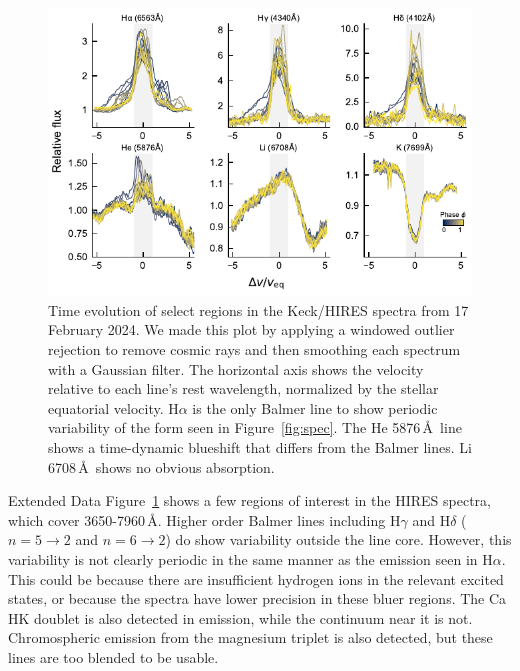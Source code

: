 \documentclass{nature3}
\begin{document}
\begin{methods}
\begin{figure}[!t]
  \centering
  \includegraphics[width=\textwidth]{figures/sf5.pdf}
  \caption{Time evolution of select regions in the Keck/HIRES
  spectra from 17 February 2024.
  We made this plot by applying a windowed outlier rejection to remove
  cosmic rays and then smoothing each spectrum with a Gaussian filter.
  The horizontal axis shows the velocity relative to each
  line's rest wavelength, normalized by the stellar equatorial
  velocity.  
  H$\alpha$ is the only Balmer line to show periodic variability of
  the form seen in Figure~\ref{fig:spec}.
  The He 5876\,\AA\ line shows a time-dynamic blueshift that 
  differs from the Balmer lines.
  Li 6708\,\AA\ shows no obvious absorption.
  }
  \label{fig:hirescuts}
\end{figure}

Extended Data Figure~\ref{fig:hirescuts} shows a few regions of interest in the
HIRES spectra, which cover 3650-7960\,\AA.  Higher order Balmer lines
including H$\gamma$ and H$\delta$ ($n=5\rightarrow2$ and
$n=6\rightarrow2$) do show variability outside the line core.
However, this variability is not clearly periodic in the same manner
as the emission seen in H$\alpha$.  This could be because there are
insufficient hydrogen ions in the relevant excited states, or because
the spectra have lower precision in these bluer regions.  The Ca HK
doublet is also detected in emission, while the continuum near it is
not.  Chromospheric emission from the magnesium triplet is also
detected, but these lines are too blended to be usable.


\end{methods}
\end{document}
